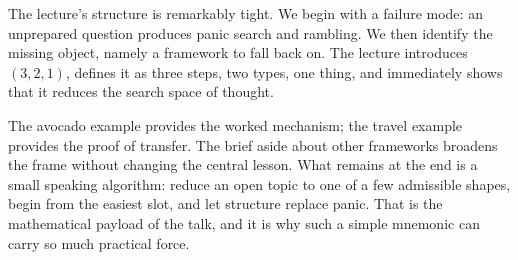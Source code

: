 The lecture’s structure is remarkably tight. We begin with a failure mode: an unprepared question produces panic search and rambling. We then identify the missing object, namely a framework to fall back on. The lecture introduces \((3,2,1)\), defines it as three steps, two types, one thing, and immediately shows that it reduces the search space of thought.

The avocado example provides the worked mechanism; the travel example provides the proof of transfer. The brief aside about other frameworks broadens the frame without changing the central lesson. What remains at the end is a small speaking algorithm: reduce an open topic to one of a few admissible shapes, begin from the easiest slot, and let structure replace panic. That is the mathematical payload of the talk, and it is why such a simple mnemonic can carry so much practical force.